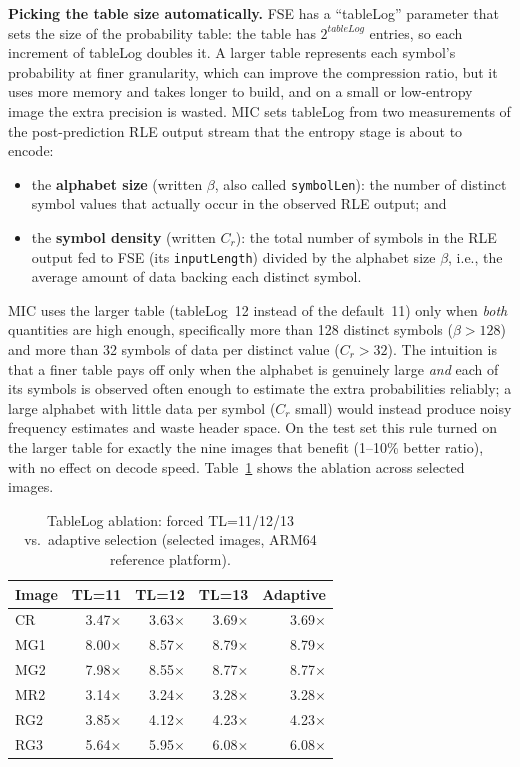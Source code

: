 \documentclass[journal]{IEEEtran}
\begin{document}
\textbf{Picking the table size automatically.} FSE has a ``tableLog''
parameter that sets the size of the probability table: the table has
$2^{\textit{tableLog}}$ entries, so each increment of tableLog doubles it. A
larger table represents each symbol's probability at finer granularity, which
can improve the compression ratio, but it uses more memory and takes longer
to build, and on a small or low-entropy image the extra precision is wasted.
MIC sets tableLog from two measurements of the post-prediction RLE output
stream that the entropy stage is about to encode:
\begin{itemize}
  \item the \textbf{alphabet size} (written $\beta$, also called
  \texttt{symbolLen}): the number of distinct symbol values that actually
  occur in the observed RLE output; and
  \item the \textbf{symbol density} (written $C_r$): the total number of
  symbols in the RLE output fed to FSE (its \texttt{inputLength}) divided by
  the alphabet size $\beta$, i.e., the average amount of data backing each
  distinct symbol.
\end{itemize}
MIC uses the larger table (tableLog~12 instead of the default~11) only when
\emph{both} quantities are high enough, specifically more than 128 distinct
symbols ($\beta > 128$) and more than 32 symbols of data per distinct value
($C_r > 32$). The intuition is that a finer table pays off only when the
alphabet is genuinely large \emph{and} each of its symbols is observed often
enough to estimate the extra probabilities reliably; a large alphabet with
little data per symbol ($C_r$ small) would instead produce noisy frequency
estimates and waste header space. On the test set this rule turned on the
larger table for exactly the nine images that benefit (1--10\% better
ratio), with no effect on decode speed. Table~\ref{tab:tablelog-ablation}
shows the ablation across selected images.

\begin{table}[htbp]
\centering
\caption{TableLog ablation: forced TL=11/12/13 vs.\ adaptive selection
(selected images, ARM64 reference platform).}
\label{tab:tablelog-ablation}
\scriptsize
\begin{tabular}{lrrrr}
\toprule
Image & TL=11 & TL=12 & TL=13 & Adaptive \\
\midrule
CR  & 3.47$\times$ & 3.63$\times$ & 3.69$\times$ & 3.69$\times$ \\
MG1 & 8.00$\times$ & 8.57$\times$ & 8.79$\times$ & 8.79$\times$ \\
MG2 & 7.98$\times$ & 8.55$\times$ & 8.77$\times$ & 8.77$\times$ \\
MR2 & 3.14$\times$ & 3.24$\times$ & 3.28$\times$ & 3.28$\times$ \\
RG2 & 3.85$\times$ & 4.12$\times$ & 4.23$\times$ & 4.23$\times$ \\
RG3 & 5.64$\times$ & 5.95$\times$ & 6.08$\times$ & 6.08$\times$ \\
\bottomrule
\end{tabular}
\end{table}
\end{document}
